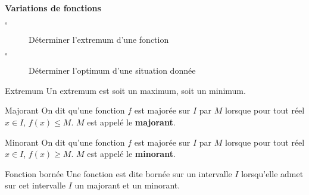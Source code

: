 \begin{titre}

\end{titre}


\begin{CpsCol}
\textbf{Variations de fonctions}
\begin{description}
\item[$\square$] Déterminer l'extremum d'une fonction
\item[$\square$] Déterminer l'optimum d'une situation donnée
\end{description}
\end{CpsCol}



\begin{DefT}{Extremum} 
Un extremum est soit un maximum, soit un minimum.
\end{DefT}


\begin{DefT}{Majorant} 
On dit qu'une fonction $f$ est majorée sur $I$ par $M$ lorsque pour tout réel $x \in I$, $f(x) \leq M$. $M$ est appelé le \textbf{majorant}.
\end{DefT}

\begin{DefT}{Minorant} 
On dit qu'une fonction $f$ est majorée sur $I$ par $M$ lorsque pour tout réel $x \in I$, $f(x) \geq M$. $M$ est appelé le \textbf{minorant}.
\end{DefT}


\begin{DefT}{Fonction bornée} 
Une fonction est dite bornée sur un intervalle $I$ lorsqu'elle admet sur cet intervalle $I$ un majorant et un minorant.
\end{DefT}







